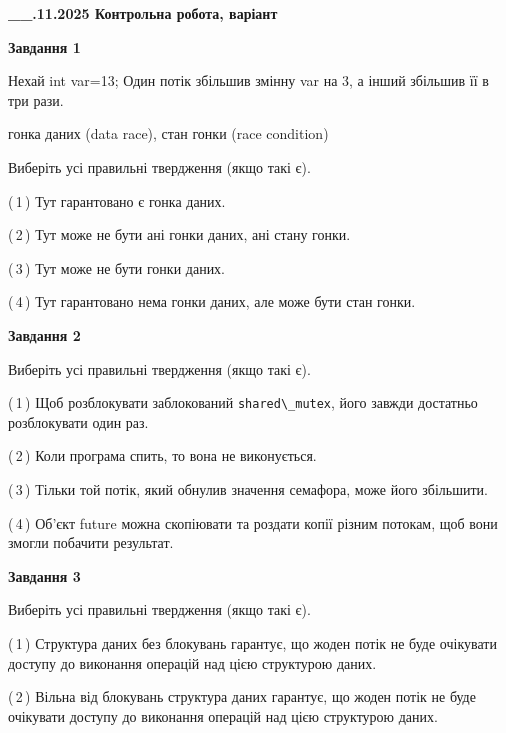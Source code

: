 \documentclass[12pt, ukrainian]{article}
\def\code#1{\Verb!#1!}
\begin{document}
\begin {large}

\textbf{\_\_.11.2025 Контрольна робота, варіант  }\par


{

\begin{center}
\textbf{Завдання 1}
\end{center}
Нехай int var=13; Один потік збільшив змінну var на 3, а інший збільшив її в три рази.

гонка даних (data race), стан гонки (race condition)

Виберіть усі правильні твердження (якщо такі є).\par
\vspace{2mm}
(\,1\,) Тут гарантовано є гонка даних.%

(\,2\,) Тут може не бути ані гонки даних, ані стану гонки.%

(\,3\,) Тут може не бути гонки даних.%

(\,4\,) Тут гарантовано нема гонки даних, але може бути стан гонки.%



\begin{center}
\textbf{Завдання 2}
\end{center}
Виберіть усі правильні твердження (якщо такі є).\par
\vspace{2mm}

(\,1\,) Щоб розблокувати заблокований \code{shared\_mutex}, його завжди достатньо розблокувати один раз.%

(\,2\,) Коли програма спить, то вона не виконується.%

(\,3\,) Тільки той потік, який обнулив значення семафора, може його збільшити.%

(\,4\,) Об’єкт future можна скопіювати та роздати копії різним потокам, щоб вони змогли побачити результат.%



\begin{center}
\textbf{Завдання 3}
\end{center}
Виберіть усі правильні твердження (якщо такі є).\par
\vspace{2mm}

(\,1\,) Структура даних без блокувань гарантує, що жоден потік не буде очікувати доступу до виконання операцій над цією структурою даних.%

(\,2\,) Вільна від блокувань структура даних гарантує, що жоден потік не буде очікувати доступу до виконання операцій над цією структурою даних.%

}
\end{large}
\end{document}
